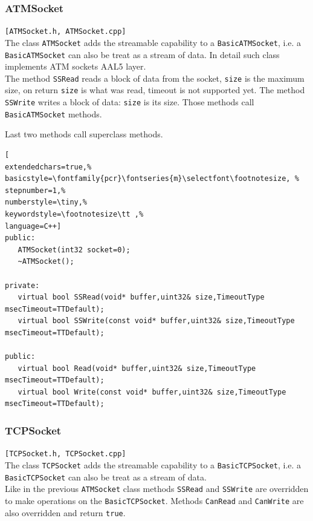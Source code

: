 \subsubsection{ATMSocket}
\texttt{[ATMSocket.h, ATMSocket.cpp]}\\
The class \texttt{ATMSocket} adds the streamable capability to a \texttt{BasicATMSocket}, i.e. a \texttt{BasicATMSocket} can also be treat as a stream of data. In detail such class implements ATM sockets AAL5 layer.\\


The method \texttt{SSRead} reads a block of data from the socket, \texttt{size} is the maximum size, on return \texttt{size} is what was read, timeout is not supported yet. The method \texttt{SSWrite} writes a block of data: \texttt{size} is its size. Those methods call \texttt{BasicATMSocket} methods.

Last two methods call superclass methods.
\begin{lstlisting}[
extendedchars=true,%
basicstyle=\fontfamily{pcr}\fontseries{m}\selectfont\footnotesize, %
stepnumber=1,%
numberstyle=\tiny,%
keywordstyle=\footnotesize\tt ,%
language=C++]
public:
   ATMSocket(int32 socket=0);
   ~ATMSocket();

private:
   virtual bool SSRead(void* buffer,uint32& size,TimeoutType msecTimeout=TTDefault);
   virtual bool SSWrite(const void* buffer,uint32& size,TimeoutType msecTimeout=TTDefault);

public:
   virtual bool Read(void* buffer,uint32& size,TimeoutType msecTimeout=TTDefault);
   virtual bool Write(const void* buffer,uint32& size,TimeoutType msecTimeout=TTDefault);
\end{lstlisting}



\subsubsection{TCPSocket}
\texttt{[TCPSocket.h, TCPSocket.cpp]}\\
The class \texttt{TCPSocket} adds the streamable capability to a \texttt{BasicTCPSocket}, i.e. a \texttt{BasicTCPSocket} can also be treat as a stream of data. \\


Like in the previous \texttt{ATMSocket} class methods \texttt{SSRead} and \texttt{SSWrite} are overridden to make operations on the \texttt{BasicTCPSocket}. Methods \texttt{CanRead} and \texttt{CanWrite} are also overridden and return \texttt{true}.\\


